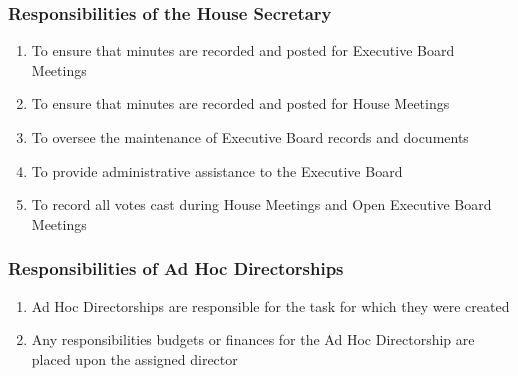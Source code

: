 \documentclass{article}
\newcommand{\asubsection}[1]{\subsubsection{#1} \label{#1}}
\begin{document}
\asubsection{Responsibilities of the House Secretary}
\begin{enumerate}
	\item To ensure that minutes are recorded and posted for Executive Board Meetings
	\item To ensure that minutes are recorded and posted for House Meetings
	\item To oversee the maintenance of Executive Board records and documents
	\item To provide administrative assistance to the Executive Board
	\item To record all votes cast during House Meetings and Open Executive Board Meetings
\end{enumerate}

\asubsection{Responsibilities of Ad Hoc Directorships}
\begin{enumerate}
	\item Ad Hoc Directorships are responsible for the task for which they were created
	\item Any responsibilities budgets or finances for the Ad Hoc Directorship are placed upon the assigned director
\end{enumerate}
\end{document}
